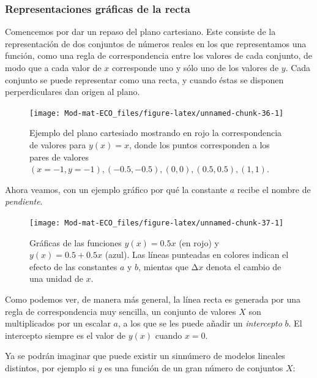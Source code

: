 \documentclass[
]{book}
\begin{document}
\hypertarget{representaciones-gruxe1ficas-de-la-recta}{%
\subsubsection{Representaciones gráficas de la recta}\label{representaciones-gruxe1ficas-de-la-recta}}

Comencemos por dar un repaso del plano cartesiano. Este consiste de la representación de dos conjuntos de números reales en los que representamos una función, como una regla de correspondencia entre los valores de cada conjunto, de modo que a cada valor de \(x\) corresponde uno y sólo uno de los valores de \(y\). Cada conjunto se puede representar como una recta, y cuando éstas se disponen perperdiculares dan origen al plano.

\begin{figure}

{\centering \texttt{[image: Mod-mat-ECO\_files/figure-latex/unnamed-chunk-36-1]} 

}

\caption{Ejemplo del plano cartesiado mostrando en rojo la correspondencia de valores para $y(x) = x$, donde los puntos corresponden a los pares de valores $(x = -1, y = -1), (-0.5, -0.5), (0, 0), (0.5, 0.5), (1, 1)$.}\label{fig:unnamed-chunk-36}
\end{figure}

Ahora veamos, con un ejemplo gráfico por qué la constante \(a\) recibe el nombre de \emph{pendiente}.

\begin{figure}

{\centering \texttt{[image: Mod-mat-ECO\_files/figure-latex/unnamed-chunk-37-1]} 

}

\caption{Gráficas de las funciones $y(x) = 0.5 x$ (en rojo) y $y(x) = 0.5 + 0.5 x$ (azul). Las líneas punteadas en colores indican el efecto de las constantes $a$ y $b$, mientas que Δ$x$ denota el cambio de una unidad de $x$.}\label{fig:unnamed-chunk-37}
\end{figure}

Como podemos ver, de manera más general, la línea recta es generada por una regla de correspondencia muy sencilla, un conjunto de valores \(X\) son multiplicados por un escalar \(a\), a los que se les puede añadir un \emph{intercepto} \(b\). El intercepto siempre es el valor de \(y(x)\) cuando \(x = 0\).

Ya se podrán imaginar que puede existir un sinnúmero de modelos lineales distintos, por ejemplo si \(y\) es una función de un gran número de conjuntos \(X\):
\end{document}
